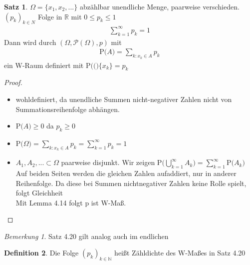 \documentclass[a4paper,12pt,fleqn]{scrartcl}
\newcommand{\m}[1]{\mathcal{ #1 }}
\newcommand{\p}[1]{\text{P(} #1 \text{)}}
\theoremstyle{definition}
\newtheorem{definition}{Definition}[section]
\newtheorem{satz}[definition]{Satz}
\theoremstyle{plain}
\theoremstyle{remark}
\newtheorem*{bemerkung}{Bemerkung}
\begin{document}
\begin{satz}
	$\Omega = \{ x_1,x_2,... \}$ abzählbar unendliche Menge, paarweise verschieden.
	$(p_k)_{k \in N}$ Folge in $\mathbb{R}$ mit $ 0 \leq p_k \leq 1$
	\begin{align*}
	\sum_{k=1}^{\infty}{p_k} = 1
\end{align*}	 
Dann wird durch $( \Omega , \m{P}(\Omega)  , p)$ mit 
\begin{align*}
\p{A} = \sum_{k:x_k \in A}{p_k}
\end{align*}
ein W-Raum definiert mit $\p( \{ x_k \} = p_k$
\end{satz}
\begin{proof}
\begin{itemize}
\item wohldefiniert, da unendliche Summen nicht-negativer Zahlen nicht von Summationsreihenfolge abhängen.
\item $\p{A} \geq 0$ da $p_k \geq 0$
\item $\p{ \Omega } = \sum_{k:x_k \in A}{p_k} = \sum_{k=1}^{\infty}{p_k} = 1$
\item $A_1, A_2,... \subset \Omega $ paarweise disjunkt. Wir zeigen $ \p{ \bigcup_{k=1}^{ \infty }{A_k} } = \sum_{k=1}^{\infty}{\p{A_k}}$     
Auf beiden Seiten werden die gleichen Zahlen aufaddiert, nur in anderer Reihenfolge. Da diese bei Summen nichtnegativer Zahlen keine Rolle spielt, folgt Gleichheit \\
Mit Lemma 4.14 folgt p ist W-Maß.
\end{itemize}
\end{proof}

\begin{bemerkung}
Satz 4.20 gilt analog auch im endlichen
\end{bemerkung}

\begin{definition}
Die Folge $(p_k)_{k \in \mathbb{N}}$ heißt Zähldichte des W-Maßes in Satz 4.20
\end{definition}
\end{document}

